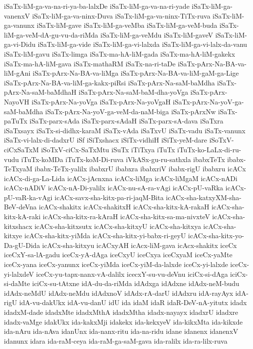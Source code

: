 {iSaTx-liM-ga-va-na-ri-ya-ba-lalxDe
iSaTx-liM-ga-va-na-ri-yade
iSaTx-liM-ga-vanenxV
iSaTx-liM-ga-va-ninx-Duva
iSaTx-liM-ga-va-ninx-TiTx-ruva
iSaTx-liM-ga-vanunx
iSaTx-liM-gave
iSaTx-liM-ga-veMba
iSaTx-liM-ga-veM-buda
iSaTx-liM-ga-veM-dA-gu-vu-da-riMda
iSaTx-liM-ga-veMdu
iSaTx-liM-gaveV
iSaTx-liM-ga-vi-Didu
iSaTx-liM-ga-vide
iSaTx-liM-ga-vi-lalxda
iSaTx-liM-ga-vi-lalx-da-vanu
iSaTx-liM-gavu
iSaTx-limga
iSaTx-ma-hA-liM-gada
iSaTx-ma-hA-liM-gakekx
iSaTx-ma-hA-liM-gava
iSaTx-mathaRM
iSaTx-na-ri-taDe
iSaTx-pArx-Na-BA-va-liM-gAni
iSaTx-pArx-Na-BA-va-liMga
iSaTx-pArx-Na-BA-va-liM-gaM-ga-Lige
iSaTx-pArx-Na-BA-va-liM-ga-kakx-piRsi
iSaTx-pArx-Na-saM-baMdha
iSaTx-pArx-Na-saM-baMdhaH
iSaTx-pArx-Na-saM-baM-dha-yoVga
iSaTx-pArx-NayoVH
iSaTx-pArx-Na-yoVga
iSaTx-pArx-Na-yoVgaH
iSaTx-pArx-Na-yoV-ga-saM-baMdha
iSaTx-pArx-Na-yoV-ga-veM-da-naM-biga
iSaTx-pArxNw
iSaTx-paTuTx
iSaTx-parx-sAda
iSaTx-parx-sAdaH
iSaTx-parx-sA-dava
iSaTxra
iSaTxsayx
iSaTx-si-didhx-karaM
iSaTx-vAda
iSaTxvU
iSaTx-vadu
iSaTx-vanunx
iSaTx-vi-lalx-di-dadxrU
iSf
iSiTxshacx
iSiTx-vidhiH
iSiTx-yeM-dare
iSoTxV-ciCxSaTxM
iSoTxV-ciCx-SaTxMtu
iSuTx
iTiTxya
iTuTx
iTuTx-ko-LaLx-di-ru-vudu
iTuTx-koMDa
iTuTx-koM-Di-ruva
iVkASx-gu-ru-sathxla
ibabxTeTx
ibabx-TeTxyaM
ibabx-TeTx-yalilx
ibabxrU
ibabxra
ibabxriV
ibabx-rigU
ibabxru
icACx
icACx-di-ga-La-Lida
icACx-jAcnxna
icACx-liMga
icACx-liMgaM
icACx-nADi
icACx-nADiV
icACx-nA-Di-yalilx
icACx-nu-sA-ra-vAgi
icACx-pU-vaRka
icACx-pU-vaR-ka-vAgi
icACx-savx-sha-kitx-pa-ri-jaqM-Bita
icACx-sha-katxyXM-sha-BeV-deVna
icACx-shakitx
icACx-shakitxH
icACx-sha-kitx-kA-rakaH
icACx-sha-kitx-kA-raki
icACx-sha-kitx-ra-kAraH
icACx-sha-kitx-sa-ma-nivxteV
icACx-sha-kitxshacx
icACx-sha-kitxsutx
icACx-sha-kitxyU
icACx-sha-kitxya
icACx-sha-kitxye
icACx-sha-kitx-yiMda
icACx-sha-kitx-yi-babx-ri-geyU
icACx-sha-kitx-yo-Da-gU-Dida
icACx-sha-kitxyu
icACxyAH
icAcx-liM-gava
icAcx-shakitx
iceCx
iceCxY-sa-lA-gadu
iceCx-yA-dAga
iceCxyU
iceCxya
iceCxyaM
iceCx-yaMte
iceCx-yana
iceCx-yanunx
iceCx-yiMda
iceCx-yiM-da-lalxde
iceCx-yi-lalxde
iceCx-yi-lalxdeV
iceCx-yu-tapx-nanx-vA-dalilx
icecxY-su-vu-deVnu
iciCx-si-dAga
iciCx-si-daMte
iciCx-su-tAtxne
idA-du-da-riMda
idAdxga
idAdxne
idAdx-neM-budu
idAdx-neMdU
idAdx-neMdu
idAdxnoV
idAdx-rA-darU
idAdxru
idA-rayAyx
idA-rigU
idA-vu-dakUkx
idA-vu-danU
idU
ida
idaM
idaR
idaR-DeV-nA-yitutx
idadx
idadxM-dade
idadxMte
idadxMthA
idadxMtha
idadx-nayayx
idadxrU
idadxre
idadx-vaMge
idakUkx
ida-kakxMji
idakekx
ida-kekxyeV
ida-kikxMta
ida-kikxde
ida-nAru
ida-nAva
idanUnx
ida-nanx-ritu
ida-na-ridu
idane
idanenx
idanenxV
idanunx
idara
ida-raM-ceya
ida-raM-ga-saM-gava
ida-ralilx
ida-ra-lilx-ruva
}
